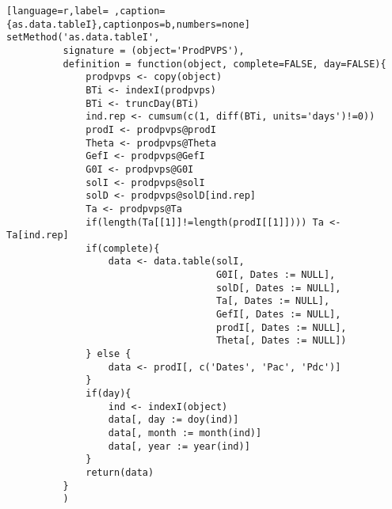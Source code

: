 \begin{lstlisting}[language=r,label= ,caption={as.data.tableI},captionpos=b,numbers=none]
setMethod('as.data.tableI',
          signature = (object='ProdPVPS'),
          definition = function(object, complete=FALSE, day=FALSE){
              prodpvps <- copy(object)
              BTi <- indexI(prodpvps)
              BTi <- truncDay(BTi)
              ind.rep <- cumsum(c(1, diff(BTi, units='days')!=0))
              prodI <- prodpvps@prodI
              Theta <- prodpvps@Theta
              GefI <- prodpvps@GefI
              G0I <- prodpvps@G0I
              solI <- prodpvps@solI
              solD <- prodpvps@solD[ind.rep]
              Ta <- prodpvps@Ta
              if(length(Ta[[1]]!=length(prodI[[1]]))) Ta <- Ta[ind.rep]
              if(complete){
                  data <- data.table(solI,
                                     G0I[, Dates := NULL],
                                     solD[, Dates := NULL],
                                     Ta[, Dates := NULL],
                                     GefI[, Dates := NULL],
                                     prodI[, Dates := NULL],
                                     Theta[, Dates := NULL])
              } else {
                  data <- prodI[, c('Dates', 'Pac', 'Pdc')]
              }
              if(day){
                  ind <- indexI(object)
                  data[, day := doy(ind)]
                  data[, month := month(ind)]
                  data[, year := year(ind)]
              }
              return(data)
          }
          )
\end{lstlisting}
